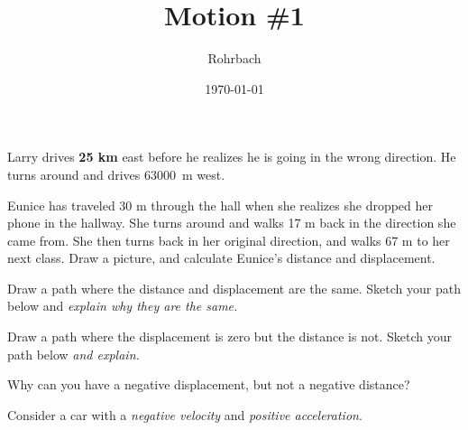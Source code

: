 \documentclass[12pt]{exam}
\title{Motion \#1}
\author{Rohrbach}
\date{\today}
\begin{document}
\maketitle

\begin{questions}
  \question 
    Larry drives {\bf  25 km} east before he realizes he is going in the wrong direction.  He turns around and drives \SI{63000}{\meter} west. 

    

  \question
    Eunice has traveled 30 m through the hall when she realizes she dropped her phone in the hallway.  She turns around and walks 17 m back in the direction she came from.  She then turns back in her original direction, and walks 67 m to her next class.  Draw a picture, and calculate Eunice's distance and displacement.
    \vs[2]
  
  \question
    Draw a path where the distance and displacement are the same.  Sketch your path below and \emph{explain why they are the same.}
    \vs

  \question
    Draw a path where the displacement is zero but the distance is not.  Sketch your path below \emph{and explain.}
    \vs

  \pagebreak

  \question
    Why can you have a negative displacement, but not a negative distance?
    \vs

  \question
    Consider a car with a \emph{negative velocity} and \emph{positive acceleration}.

\end{questions}
\end{document}
